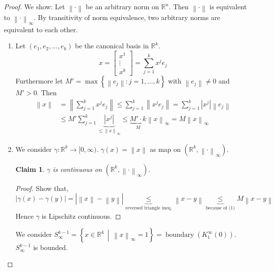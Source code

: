 \documentclass{article}
\newtheorem*{claim}{Claim}%
\newcommand{\set}[1]{\left\{#1\right\}}
\newcommand{\setdef}[2]{\left\{\left.#1\,\middle|\,#2\right.\right\}}
\newcommand{\norm}[1]{\left\|#1\right\|}
\newcommand{\card}[1]{\left|#1\right|}
\begin{document}
\begin{proof}
  We show: Let $\norm{\cdot}$ be an arbitrary norm on $\mathbb R^n$. Then $\norm{\cdot}$ is equivalent to $\norm{\cdot}_{\infty}$. By transitivity of norm equivalence, two arbitrary norms are equivalent to each other.
  \begin{enumerate}
    \item Let $(e_1, e_2, \dots, e_k)$ be the canonical basis in $\mathbb R^k$.
      \[ x = \begin{bmatrix} x^1 \\ \vdots \\ x^k \end{bmatrix} = \sum_{j=1}^k x^j e_j \]
      Furthermore let $M' = \max\set{\norm{e_j}: j = 1, \dots, k}$ with $\norm{e_j} \neq 0$ and $M' > 0$.
      Then
      \begin{align*}
        \norm{x} &= \norm{\sum_{j=1}^k x^j e_j} \leq \sum_{j=1}^k \norm{x^j e_j} = \sum_{j=1}^k \card{x^j} \norm{e_j} \\
                 &\leq M' \sum_{j=1}^k \underbrace{\card{x^j}}_{\leq \norm{x}_\infty} \leq \underbrace{M' \cdot k}_{M} \norm{x}_{\infty} = M \norm{x}_\infty
      \end{align*}
    \item
      We consider $\gamma: \mathbb R^k \to [0, \infty)$.
      $\gamma(x) = \norm{x}$ as map on $(\mathbb R^k, \norm{\cdot}_{\infty})$.

      \begin{claim}
        $\gamma$ is continuous on $(\mathbb R^k, \norm{\cdot}_{\infty})$.
      \end{claim}
      \begin{proof}
        Show that,
        \[ \card{\gamma(x) - \gamma(y)} = \card{\norm{x} - \norm{y}} \underbrace{\leq}_{\text{reversed triangle ineq.}} \norm{x - y} \underbrace{\leq}_{\text{because of (1)}} M \norm{x - y} \]
        Hence $\gamma$ is Lipschitz continuous.
      \end{proof}

      We consider $S_{\infty}^{k-1} = \setdef{x \in \mathbb R^k}{\norm{x}_{\infty} = 1} = \operatorname{boundary}(K_1^\infty(0))$.
      $S_{\infty}^{k-1}$ is bounded.


\end{enumerate}
\end{proof}
\end{document}
